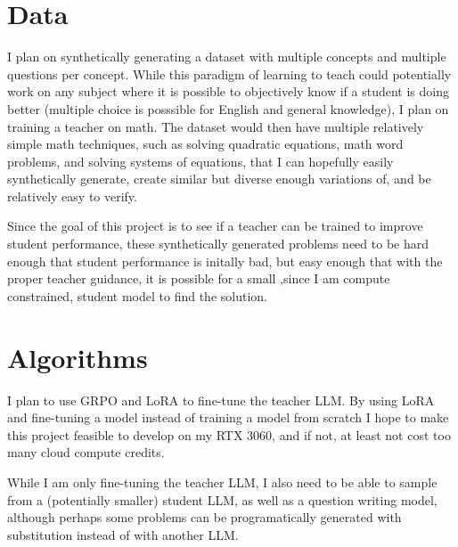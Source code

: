 \documentclass{article}
\begin{document}
\section{Data}
I plan on synthetically generating a dataset with multiple concepts and multiple questions per concept.
While this paradigm of learning to teach could potentially work on any subject where it is possible to
objectively know if a student is doing better (multiple choice is posssible for English and general knowledge),
I plan on training a teacher on math. The dataset would then have multiple relatively simple math techniques,
such as solving quadratic equations, math word problems, and solving systems of equations, that I can hopefully
easily synthetically generate, create similar but diverse enough variations of, and be relatively easy to verify.

Since the goal of this project is to see if a teacher can be trained to improve student performance,
these synthetically generated problems need to be hard enough that student performance is initally bad,
but easy enough that with the proper teacher guidance, it is possible for a small ,since I am compute
constrained, student model to find the solution.

\section{Algorithms}
I plan to use GRPO and LoRA to fine-tune the teacher LLM. By using LoRA and fine-tuning a model instead
of training a model from scratch I hope to make this project feasible to develop on my RTX 3060, and if not,
at least not cost too many cloud compute credits.

While I am only fine-tuning the teacher LLM, I also need to be able to sample from a (potentially smaller)
student LLM, as well as a question writing model, although perhaps some problems can be programatically
generated with substitution instead of with another LLM.
\end{document}
